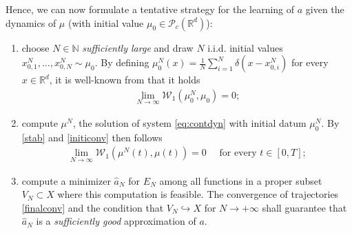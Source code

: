 \documentclass[A4paper,11pt]{article}
\theoremstyle{definition}
\newcommand{\N}{\mathbb{N}}
\newcommand{\R}{\mathbb{R}}
\newcommand{\W}{\mathcal{W}}
\begin{document}
Hence, we can now formulate a tentative strategy for the learning of $a$ given the dynamics of $\mu$ (with initial value $\mu_0\in \mathcal{P}_c(\R^d)$):
\begin{enumerate}
\item choose $N \in \N$ \textit{sufficiently large} and draw $N$ i.i.d. initial values $x^N_{0,1}, \ldots, x^N_{0,N} \sim \mu_0$. By defining $\mu^N_0(x) = \frac{1}{N}\sum^N_{i = 1} \delta(x - x^N_{0,i})$ for every $x \in \R^d$, it is well-known from \cite[Lemma 3.3]{fornahuetter} that it holds
\begin{align}\label{initiconv}
\lim_{N \rightarrow \infty} \W_1(\mu^N_0,\mu_0) = 0;
\end{align}
\item compute $\mu^N$, the solution of system \eqref{eq:contdyn} with initial datum $\mu^N_0$. By \eqref{stab} and \eqref{initiconv} then follows
\begin{align}\label{finalconv}
\lim_{N \rightarrow \infty} \W_1(\mu^N(t),\mu(t)) = 0 \quad \text{ for every } t \in [0,T];
\end{align}
\item compute a minimizer $\widehat a_N$ for $E_N$ among all functions in a proper subset $V_N \subset X$ where this computation is feasible. The convergence of trajectories \eqref{finalconv} and the condition that $V_N \hookrightarrow X$ for $N \rightarrow +\infty$ shall guarantee that $\widehat a_N$ is a \textit{sufficiently good} approximation of $a$.
\end{enumerate}
\end{document}
